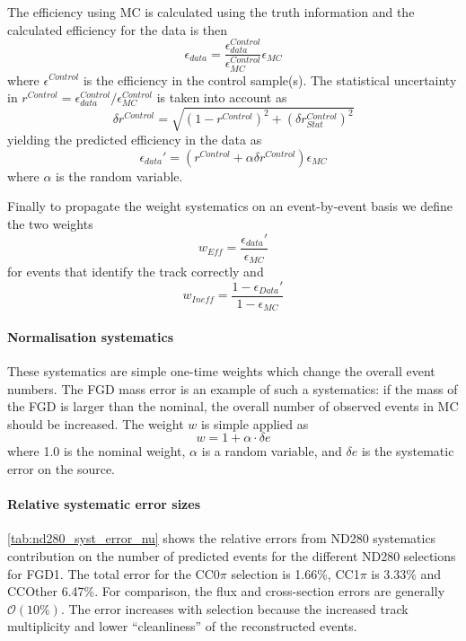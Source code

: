The efficiency using MC is calculated using the truth information and the calculated efficiency for the data is then
\begin{equation}
\epsilon_{data} = \frac{\epsilon_{data}^{Control}}{\epsilon_{MC}^{Control}} \epsilon_{MC}
\end{equation}
where $\epsilon^{Control}$ is the efficiency in the control sample(s). The statistical uncertainty in $r^{Control} = \epsilon^{Control}_{data}/\epsilon^{Control}_{MC}$ is taken into account as
\begin{equation}
\delta r^{Control} = \sqrt{\left(1-r^{Control}\right)^2 + \left(\delta r^{Control}_{Stat}\right)^2}
\end{equation}
yielding the predicted efficiency in the data as
\begin{equation}
\epsilon_{data}' = \left(r^{Control} + \alpha \delta r^{Control}\right)\epsilon_{MC}
\end{equation}
where $\alpha$ is the random variable.

Finally to propagate the weight systematics on an event-by-event basis we define the two weights
\begin{equation}
w_{Eff} = \frac{\epsilon_{data}'}{\epsilon_{MC}}
\end{equation}
for events that identify the track correctly and
\begin{equation}
w_{Ineff} = \frac{1-\epsilon_{Data}'}{1-\epsilon_{MC}}
\end{equation}

\paragraph{Normalisation systematics}
These systematics are simple one-time weights which change the overall event numbers. The FGD mass error is an example of such a systematics: if the mass of the FGD is larger than the nominal, the overall number of observed events in MC should be increased. The weight $w$ is simple applied as
\begin{equation}
w = 1+\alpha \cdot \delta e
\end{equation}
where 1.0 is the nominal weight, $\alpha$ is a random variable, and $\delta e$ is the systematic error on the source.


\paragraph{Relative systematic error sizes}
\autoref{tab:nd280_syst_error_nu} shows the relative errors from ND280 systematics contribution on the number of predicted events for the different ND280 \numu selections for FGD1. The total error for the CC0$\pi$ selection is 1.66\%, CC1$\pi$ is 3.33\% and CCOther 6.47\%. For comparison, the flux and cross-section errors are generally $\mathcal{O}\left(10\%\right)$. The error increases with selection because the increased track multiplicity and lower ``cleanliness'' of the reconstructed events. 

